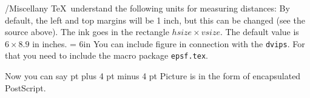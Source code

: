 /{Miscellany}
\TeX\ understand the following units for measuring distances:
\medskip
By default, the left and top margins will be 1 inch, but this can be changed (see the source above).
\hoffset -5mm \voffset 2mm %
The ink goes in the rectangle $hsize \times vsize$.  The default value is $6 \times 8.9$ in inches.
\hsize = 6in \vsize=8.9in
\medskip
You can include figure in connection with the {\tt dvips}.  For that you need to include the 
macro package {\tt epsf.tex}.

Now you can say
 pt plus 4 pt minus 4 pt %
{}\bigskip
\noindent Picture is in the form of encapsulated PostScript.
